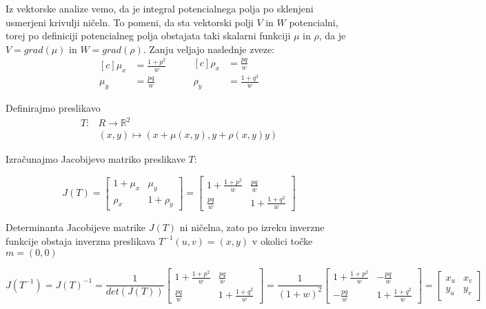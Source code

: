 \documentclass[mat1]{fmfdelo}
\newcommand{\R}{\mathbb R}
\begin{document}
\begin{dokaz}
    Iz vektorske analize vemo, da je integral potencialnega polja po sklenjeni usmerjeni krivulji ničeln. To pomeni, da sta vektorski
    polji $V$ in $W$ potencialni, torej po definiciji potencialneg polja obstajata taki skalarni funkciji $\mu$ in $\rho$, da je $V = grad(\mu)$ in $W = grad(\rho)$.
    Zanju veljajo naslednje zveze:
    \begin{equation*}
        \begin{aligned}[c]
            \mu_x &= \frac{1 + p^2}{w} \\
            \mu_y &= \frac{pq}{w}
        \end{aligned}
        \qquad
        \begin{aligned}[c]
            \rho_x &= \frac{pq}{w} \\
            \rho_y &= \frac{1 + q^2}{w}
        \end{aligned}
    \end{equation*} 

    Definirajmo preslikavo 
    \begin{align*}
        T : & R \to \R^2 \\
        & (x, y) \mapsto \left( x + \mu (x, y) , y + \rho (x, y) y\right) 
    \end{align*}

    Izračunajmo Jacobijevo matriko preslikave $T$:

    $$ J(T) = 
    \left[
        \begin{matrix}
            1 + \mu_x & \mu_y \\
            \rho_x & 1 + \rho_y
        \end{matrix}
    \right]
     = 
    \left[
        \begin{matrix}
            1 + \frac{1 + p^2}{w} & \frac{pq}{w} \\
            \frac{pq}{w} & 1 + \frac{1 + q^2}{w}
        \end{matrix}
    \right]
    $$

    Determinanta Jacobijeve matrike $J(T)$ ni ničelna, zato po izreku inverzne funkcije obstaja 
    inverzna preslikava $T^{-1} (u, v) = (x, y)$ v okolici točke $m = (0, 0)$

    $$
        J(T^{-1}) = J(T)^{-1}
        = 
            \frac{1}{det(J(T))} 
            \left[
            \begin{matrix}
                1 + \frac{1 + p^2}{w} & \frac{pq}{w} \\
                \frac{pq}{w} & 1 + \frac{1 + q^2}{w}
            \end{matrix} 
        \right]
        = 
            \frac{1}{(1 + w)^2}
            \left[
            \begin{matrix}
                1 + \frac{1 + p^2}{w} & - \frac{pq}{w} \\
                - \frac{pq}{w} & 1 + \frac{1 + q^2}{w}
            \end{matrix}
        \right]
        = 
        \left[
            \begin{matrix}
                x_u & x_v \\
                y_u & y_v
            \end{matrix}
        \right]
    $$


\end{dokaz}
\end{document}
